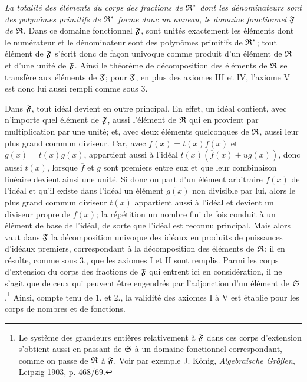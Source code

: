 \emph{La totalité des éléments du corps des fractions de $\mathfrak{R}^*$ dont les dénominateurs sont des polynômes primitifs de $\mathfrak{R}^*$ forme donc un anneau, le domaine fonctionnel $\mathfrak{F}$ de $\mathfrak{R}$.} Dans ce domaine fonctionnel $\mathfrak{F}$, sont unités exactement les éléments dont le numérateur et le dénominateur sont des polynômes primitifs de $\mathfrak{R}^*$; tout élément de $\mathfrak{F}$ s'écrit donc de façon univoque comme produit d'un élément de $\mathfrak{R}$ et d'une unité de $\mathfrak{F}$. Ainsi le théorème de décomposition des éléments de $\mathfrak{R}$ se transfère aux éléments de $\mathfrak{F}$; pour $\mathfrak{F}$, en plus des axiomes III et IV, l'axiome V est donc lui aussi rempli comme sous 3.

Dans $\mathfrak{F}$, tout idéal devient en outre principal. En effet, un idéal contient, avec n'importe quel élément de $\mathfrak{F}$, aussi l'élément de $\mathfrak{R}$ qui en provient par multiplication par une unité; et, avec deux éléments quelconques de $\mathfrak{R}$, aussi leur plus grand commun diviseur. Car, avec $f(x)=t(x)\overline f(x)$ et $g(x)=t(x)\overline g(x)$, appartient aussi à l'idéal $t(x)(\overline f(x)+u\overline g(x))$, donc aussi $t(x)$, lorsque $\overline f$ et $\overline g$ sont premiers entre eux et que leur combinaison linéaire devient ainsi une unité. Si donc on part d'un élément arbitraire $f(x)$ de l'idéal et qu'il existe dans l'idéal un élément $g(x)$ non divisible par lui, alors le plus grand commun diviseur $t(x)$ appartient aussi à l'idéal et devient un diviseur propre de $f(x)$; la répétition un nombre fini de fois conduit à un élément de base de l'idéal, de sorte que l'idéal est reconnu principal. Mais alors vaut dans $\mathfrak{F}$ la décomposition univoque des idéaux en produits de puissances d'idéaux premiers, correspondant à la décomposition des éléments de $\mathfrak{R}$; il en résulte, comme sous 3., que les axiomes I et II sont remplis. Parmi les corps d'extension du corps des fractions de $\mathfrak{F}$ qui entrent ici en considération, il ne s'agit que de ceux qui peuvent être engendrés par l'adjonction d'un élément de $\mathfrak{S}$.\footnote{Le système des grandeurs entières relativement à $\mathfrak{F}$ dans ces corps d'extension s'obtient aussi en passant de $\mathfrak{S}$ à un domaine fonctionnel correspondant, comme on passe de $\mathfrak{R}$ à $\mathfrak{F}$. Voir par exemple J. König, \emph{Algebraische Größen}, Leipzig 1903, p. 468/69.} Ainsi, compte tenu de 1. et 2., la validité des axiomes I à V est établie pour les corps de nombres et de fonctions.
